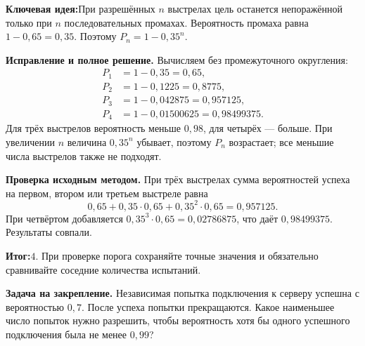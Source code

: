 \documentclass[a4paper,11pt]{article}
\newcommand{\rubric}[1]{\par\smallskip\textbf{#1}\enspace}
\newcommand{\idea}{\textcolor{darkaccent}{\textbf{Ключевая идея:}}\enspace}
\newcommand{\result}{\textcolor{darkaccent}{\textbf{Итог:}}\enspace}
\begin{document}
\idea При разрешённых $n$ выстрелах цель останется непоражённой только при $n$ последовательных промахах. Вероятность промаха равна $1-0{,}65=0{,}35$. Поэтому $P_n=1-0{,}35^n$.

\rubric{Исправление и полное решение.} Вычисляем без промежуточного округления:
\begin{align*}
P_1&=1-0{,}35=0{,}65,\\
P_2&=1-0{,}1225=0{,}8775,\\
P_3&=1-0{,}042875=0{,}957125,\\
P_4&=1-0{,}01500625=0{,}98499375.
\end{align*}
Для трёх выстрелов вероятность меньше $0{,}98$, для четырёх --- больше. При увеличении $n$ величина $0{,}35^n$ убывает, поэтому $P_n$ возрастает; все меньшие числа выстрелов также не подходят.

\rubric{Проверка исходным методом.} При трёх выстрелах сумма вероятностей успеха на первом, втором или третьем выстреле равна
\[0{,}65+0{,}35\cdot0{,}65+0{,}35^2\cdot0{,}65=0{,}957125.\]
При четвёртом добавляется $0{,}35^3\cdot0{,}65=0{,}02786875$, что даёт $0{,}98499375$. Результаты совпали.

\result $\boxed{4}$. При проверке порога сохраняйте точные значения и обязательно сравнивайте соседние количества испытаний.

\rubric{Задача на закрепление.} Независимая попытка подключения к серверу успешна с вероятностью $0{,}7$. После успеха попытки прекращаются. Какое наименьшее число попыток нужно разрешить, чтобы вероятность хотя бы одного успешного подключения была не менее $0{,}99$?
\end{document}
